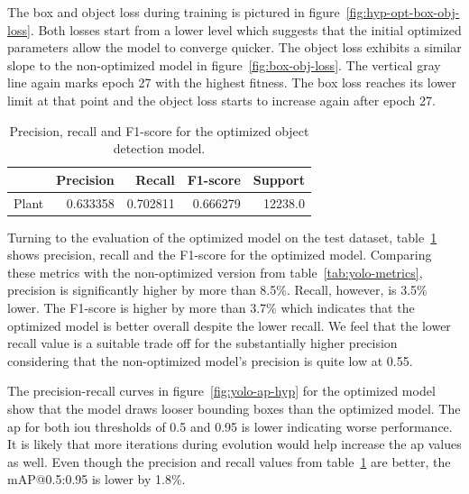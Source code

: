 \documentclass[draft,final]{vutinfth} %
\begin{document}
The box and object loss during training is pictured in
figure~\ref{fig:hyp-opt-box-obj-loss}. Both losses start from a lower
level which suggests that the initial optimized parameters allow the
model to converge quicker. The object loss exhibits a similar slope to
the non-optimized model in figure~\ref{fig:box-obj-loss}. The vertical
gray line again marks epoch 27 with the highest fitness. The box loss
reaches its lower limit at that point and the object loss starts to
increase again after epoch 27.

\begin{table}[h]
  \centering
  \begin{tabular}{lrrrr}
    \toprule
    {} &  Precision &    Recall &  F1-score &  Support \\
    \midrule
    Plant        &   0.633358 &  0.702811 &  0.666279 &  12238.0 \\
    \bottomrule
  \end{tabular}
  \caption{Precision, recall and F1-score for the optimized object
    detection model.}
  \label{tab:yolo-metrics-hyp}
\end{table}

Turning to the evaluation of the optimized model on the test dataset,
table~\ref{tab:yolo-metrics-hyp} shows precision, recall and the
F1-score for the optimized model. Comparing these metrics with the
non-optimized version from table~\ref{tab:yolo-metrics}, precision is
significantly higher by more than 8.5\%. Recall, however, is 3.5\%
lower. The F1-score is higher by more than 3.7\% which indicates that
the optimized model is better overall despite the lower recall. We
feel that the lower recall value is a suitable trade off for the
substantially higher precision considering that the non-optimized
model's precision is quite low at 0.55.

The precision-recall curves in figure~\ref{fig:yolo-ap-hyp} for the
optimized model show that the model draws looser bounding boxes than
the optimized model. The \gls{ap} for both \gls{iou} thresholds of 0.5
and 0.95 is lower indicating worse performance. It is likely that more
iterations during evolution would help increase the \gls{ap} values as
well. Even though the precision and recall values from
table~\ref{tab:yolo-metrics-hyp} are better, the \textsf{mAP}@0.5:0.95
is lower by 1.8\%.
\end{document}

